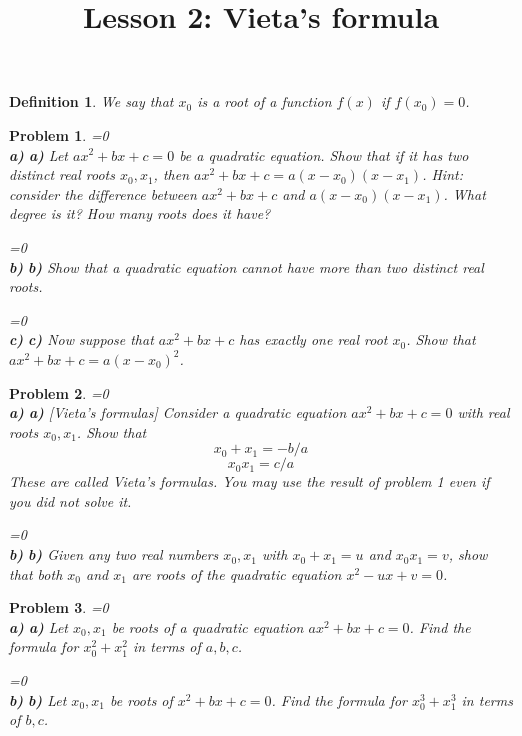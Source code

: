 \documentclass[a4paper,12pt]{article}
\title{Lesson 2: Vieta's formula}
\theoremstyle{perfect}
\newtheorem{dfn}{Definition}
\newtheorem{prb}{Problem}
\newcommand{\varline}{0}
\renewcommand\part[1]{
\ifnum\pdfstrcmp{\varline}{1}=0
    \vspace{.10in}\textbf{\\#1)}
  \else
    \textbf{#1)}
  \fi\renewcommand{\varline}{1}}
\begin{document}
 
\maketitle

\begin{dfn}
We say that $x_0$ is a root of a function $f(x)$ if $f(x_0) = 0$.
\end{dfn}

\begin{prb}
\part{a} Let $ax^2+bx+c = 0$ be a quadratic equation. Show that if it has two distinct real roots $x_0, x_1$, then $ax^2+bx+c = a(x - x_0)(x - x_1)$. Hint: consider the difference between $ax^2+bx+c$ and $a(x - x_0)(x - x_1)$. What degree is it? How many roots does it have?
\part{b} Show that a quadratic equation cannot have more than two distinct real roots.
\part{c} Now suppose that $ax^2+bx+c$ has exactly one real root $x_0$. Show that $ax^2+bx+c = a(x-x_0)^2$.
\end{prb}

\begin{prb}
\part{a}[Vieta's formulas] Consider a quadratic equation $ax^2+bx+c = 0$ with real roots $x_0, x_1$. Show that $$x_0 + x_1 = -b/a$$ $$x_0x_1 = c/a$$ These are called \textit{Vieta's formulas}. You may use the result of problem 1 even if you did not solve it.
\part{b} Given any two real numbers $x_0, x_1$ with $x_0 + x_1 = u$ and $x_0x_1 = v$, show that both $x_0$ and $x_1$ are roots of the quadratic equation $x^2 - ux+v = 0$.
\end{prb}

\begin{prb}
\part{a} Let $x_0, x_1$ be roots of a quadratic equation $ax^2+bx+c = 0$.  Find the formula for $x_0^2 + x_1^2$ in terms of $a,b,c$.
\part{b} Let $x_0, x_1$ be roots of $x^2+bx+c = 0$.  Find the formula for $x_0^3 + x_1^3$ in terms of $b,c$.
\end{prb}
\end{document}
